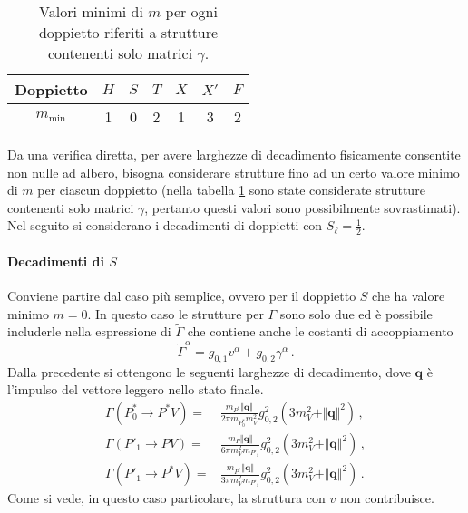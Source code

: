 \documentclass{article}
\begin{document}
\begin{table}
  \centering
  \begin{tabular}{ccccccc}
    \toprule
    Doppietto      & $H$ & $S$ & $T$ & $X$ & $X'$ & $F$ \\
    \midrule
    $m_\text{min}$ &  1  &  0  &  2  &  1  &  3   &  2  \\
    \bottomrule
  \end{tabular}
  \caption{Valori minimi di $m$ per ogni doppietto riferiti a strutture contenenti solo matrici $\gamma$.}
  \label{tab:m}
\end{table}

Da una verifica diretta, per avere larghezze di decadimento fisicamente consentite non nulle ad albero, bisogna considerare strutture fino ad un certo valore minimo di $m$ per ciascun doppietto (nella tabella \ref{tab:m} sono state considerate strutture contenenti solo matrici $\gamma$, pertanto questi valori sono possibilmente sovrastimati). Nel seguito si considerano i decadimenti di doppietti con $S_\ell = \frac{1}{2}$.

\paragraph{Decadimenti di $S$}
Conviene partire dal caso più semplice, ovvero per il doppietto $S$ che ha valore minimo $m = 0$. In questo caso le strutture per $\Gamma$ sono solo due ed è possibile includerle nella espressione di $\tilde{\Gamma}$ che contiene anche le costanti di accoppiamento
\begin{equation}
  \tilde{\Gamma}^\alpha = g_{0,1} v^\alpha + g_{0,2} \gamma^\alpha \, .
\end{equation}
Dalla precedente si ottengono le seguenti larghezze di decadimento, dove $\mathbf{q}$ è l'impulso del vettore leggero nello stato finale.
\begin{align}
  \Gamma\left( P^*_0 \to P^* V \right) =& \frac{m_{P^*} \Vert \mathbf{q} \Vert}{2 \pi  m_{P_0^*} m_V^2} g_{0,2}^2 \left(3 m_V^2+ \Vert \mathbf{q} \Vert^2\right) \, , \\
  \Gamma\left( P'_1 \to P V \right) =& \frac{m_P \Vert \mathbf{q} \Vert}{6 \pi  m_V^2 m_{P'_1}} g_{0,2}^2 \left(3 m_V^2+ \Vert \mathbf{q} \Vert^2\right) \, , \\
  \Gamma\left( P'_1 \to P^* V \right) =& \frac{m_{P^*} \Vert \mathbf{q} \Vert }{3 \pi  m_V^2 m_{P'_1}} g_{0,2}^2 \left(3 m_V^2+ \Vert \mathbf{q} \Vert^2\right) \, . 
\end{align}
Come si vede, in questo caso particolare, la struttura con $v$ non contribuisce.
\end{document}

